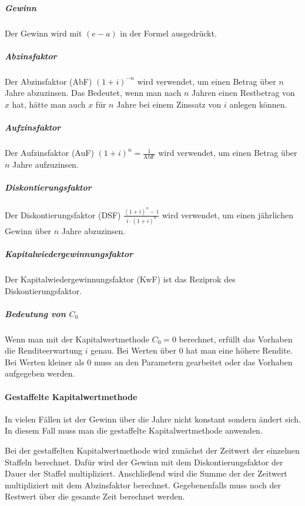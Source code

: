 \documentclass[../main.tex]{subfiles}
\begin{document}
                    \subparagraph{Gewinn}
                        Der Gewinn wird mit $\left(e - a\right)$ in der Formel ausgedrückt.
                    
                    \subparagraph{Abzinsfaktor}
                        Der Abzinsfaktor (AbF) $\left( 1 + i \right)^{-n}$ wird verwendet, um einen Betrag über $n$ Jahre abzuzinsen. Das Bedeutet, wenn man nach $n$ Jahren einen Restbetrag von $x$ hat, hätte man auch $x$ für $n$ Jahre bei einem Zinssatz von $i$ anlegen können.
                        
                    \subparagraph{Aufzinsfaktor}
                        Der Aufzinsfaktor (AuF) $\left( 1 + i \right)^{n} = \frac{1}{\text{AbF}}$ wird verwendet, um einen Betrag über $n$ Jahre aufzuzinsen.
                        
                    \subparagraph{Diskontierungsfaktor}
                        Der Diskontierungsfaktor (DSF) $\frac{\left(1 + i\right)^n - 1}{i \cdot \left( 1 + i \right)^n}$ wird verwendet, um einen jährlichen Gewinn über $n$ Jahre abzuzinsen.
                        
                    \subparagraph{Kapitalwiedergewinnungsfaktor}
                        Der Kapitalwiedergewinnungsfaktor (KwF) ist das Reziprok des Diskontierungsfaktor.
                        
                    \subparagraph{Bedeutung von $C_0$}
                        Wenn man mit der Kapitalwertmethode $C_0 = 0$ berechnet, erfüllt das Vorhaben die Renditeerwartung $i$ genau. Bei Werten über $0$ hat man eine höhere Rendite. Bei Werten kleiner als $0$ muss an den Parametern gearbeitet oder das Vorhaben aufgegeben werden.
                        
                \paragraph{Gestaffelte Kapitalwertmethode}
                    In vielen Fällen ist der Gewinn über die Jahre nicht konstant sondern ändert sich. In diesem Fall muss man die gestaffelte Kapitalwertmethode anwenden.
                    
                    Bei der gestaffelten Kapitalwertmethode wird zunächst der Zeitwert der einzelnen Staffeln berechnet. Dafür wird der Gewinn mit dem Diskontierungsfaktor der Dauer der Staffel multipliziert. Anschließend wird die Summe der der Zeitwert multipliziert mit dem Abzinsfaktor berechnet. Gegebenenfalls muss noch der Restwert über die gesamte Zeit berechnet werden.
                    
\end{document}

